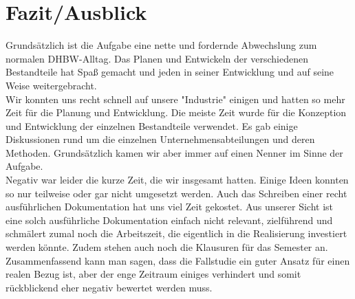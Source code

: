 \clearpage
\chapter{Fazit/Ausblick}
Grundsätzlich ist die Aufgabe eine nette und fordernde Abwechslung zum normalen DHBW-Alltag. Das Planen und Entwickeln der verschiedenen Bestandteile hat Spaß gemacht und jeden in seiner Entwicklung und auf seine Weise weitergebracht.\\
Wir konnten uns recht schnell auf unsere "Industrie" einigen und hatten so mehr Zeit für die Planung und Entwicklung. Die meiste Zeit wurde für die Konzeption und Entwicklung der einzelnen Bestandteile verwendet. Es gab einige Diskussionen rund um die einzelnen Unternehmensabteilungen und deren Methoden. Grundsätzlich kamen wir aber immer auf einen Nenner im Sinne der Aufgabe.\\
Negativ war leider die kurze Zeit, die wir insgesamt hatten. Einige Ideen konnten so nur teilweise oder gar nicht umgesetzt werden. Auch das Schreiben einer recht ausführlichen Dokumentation hat uns viel Zeit gekostet. Aus unserer Sicht ist eine solch ausführliche Dokumentation einfach nicht relevant, zielführend und schmälert zumal noch die Arbeitszeit, die eigentlich in die Realisierung investiert werden könnte. Zudem stehen auch noch die Klausuren für das Semester an.\\   
Zusammenfassend kann man sagen, dass die Fallstudie ein guter Ansatz für einen realen Bezug ist, aber der enge Zeitraum einiges verhindert und somit rückblickend eher negativ bewertet werden muss.  